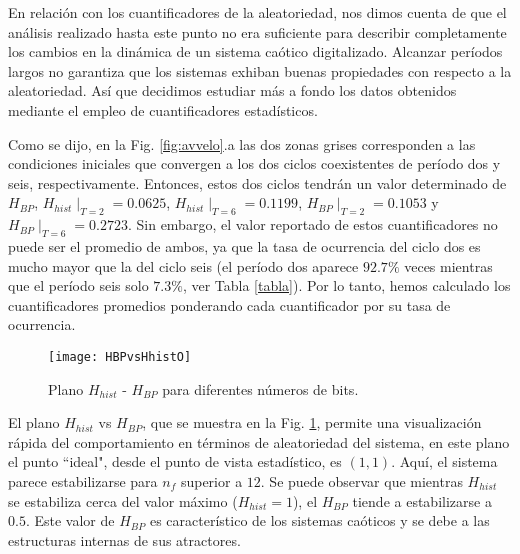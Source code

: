 En relación con los cuantificadores de la aleatoriedad, nos dimos cuenta de que el análisis realizado hasta este punto no era suficiente para describir completamente los cambios en la dinámica de un sistema caótico digitalizado.
Alcanzar períodos largos no garantiza que los sistemas exhiban buenas propiedades con respecto a la aleatoriedad.
Así que decidimos estudiar más a fondo los datos obtenidos mediante el empleo de cuantificadores estadísticos.

Como se dijo, en la Fig. \ref{fig:avvelo}.a las dos zonas grises corresponden a las condiciones iniciales que convergen a los dos ciclos coexistentes de período dos y seis, respectivamente.
Entonces, estos dos ciclos tendrán un valor determinado de  $H_{BP}$, $H_{hist}\mid_{T=2}=0.0625$, $H_{hist}\mid_{T=6}=0.1199$, $H_{BP}\mid_{T=2}=0.1053$ y $H_{BP} \mid_{T = 6} = 0.2723 $.
Sin embargo, el valor reportado de estos cuantificadores no puede ser el promedio de ambos, ya que la tasa de ocurrencia del ciclo dos es mucho mayor que la del ciclo seis (el período dos aparece $92.7 \%$ veces mientras que el período seis solo $7.3 \%$, ver Tabla \ref{tabla}).
Por lo tanto, hemos calculado los cuantificadores promedios ponderando cada cuantificador por su tasa de ocurrencia.
%
\begin{figure}
	\centering
	\texttt{[image: HBPvsHhistO]}\\
	\caption{Plano $H_{hist}$ - $H_{BP}$ para diferentes números de bits. }\label{fig:HBPvsHhist}
\end{figure}

El plano $H_{hist}$ vs $H_{BP}$, que se muestra en la Fig. \ref{fig:HBPvsHhist}, permite una visualización rápida del comportamiento en términos de aleatoriedad del sistema, en este plano el punto ``ideal", desde el punto de vista estadístico, es $(1,1)$.
Aquí, el sistema parece estabilizarse para $n_f$ superior a $12$.
Se puede observar que mientras $H_{hist}$ se estabiliza cerca del valor máximo ($ H_{hist} = 1 $), el $H_{BP}$ tiende a estabilizarse a $0.5$.
Este valor de $ H_{BP} $ es característico de los sistemas caóticos y se debe a las estructuras internas de sus atractores.

